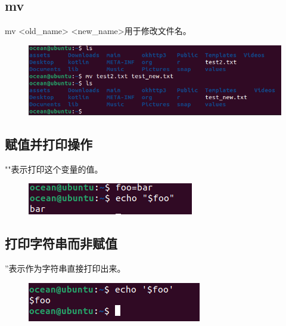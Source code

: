 \documentclass{article}
\begin{document}
\subsection{mv}
mv <old\_name> <new\_name>用于修改文件名。
\begin{figure}[H]
    \centering
    \includegraphics[width=1\linewidth]{mv.png}
\end{figure}

\subsection{赋值并打印操作}
""表示打印这个变量的值。
\begin{figure}[H]
    \centering
    \includegraphics[width=1\linewidth]{print_value.png}
\end{figure}

\subsection{打印字符串而非赋值}
''表示作为字符串直接打印出来。
\begin{figure}[H]
    \centering
    \includegraphics[width=1\linewidth]{print_string.png}
\end{figure}
\end{document}
